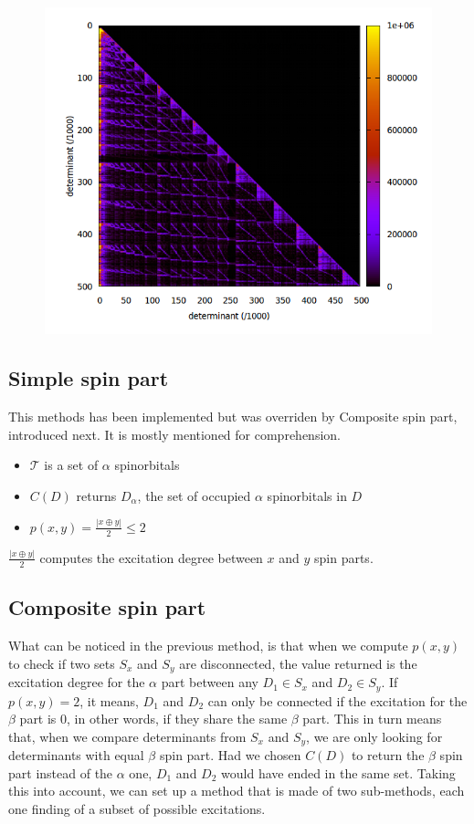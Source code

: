 \documentclass[./thesis.tex]{subfiles}
\begin{document}
\begin{figure}[H]
	\begin{center}
		\includegraphics[width=0.6\columnwidth]{figures/davidson/xor_subspace}
		\caption{{\label{fig:xor_subspace}
		}}
	\end{center}
\end{figure}


\subsection{Simple spin part}
This methods has been implemented but was overriden by Composite spin part, introduced next. It is mostly mentioned for comprehension.

\begin{itemize}
	\item
$\mathcal{T}$ is a set of $\alpha$ spinorbitals
	\item
$C(D)$ returns $D_\alpha$, the set of occupied $\alpha$ spinorbitals in $D$
	\item
$p(x, y) = \frac{|x \oplus y|}{2} \leq 2$
\end{itemize}

$\frac{|x \oplus y|}{2}$ computes the excitation degree between $x$ and $y$ spin parts. 
    

    
\subsection{Composite spin part}
What can be noticed in the previous method, is that when we compute $p(x, y)$ to check if two sets $S_x$ and $S_y$ are disconnected, the value returned is the excitation degree for the $\alpha$ part between any $D_1 \in S_x$ and $D_2 \in S_y$. If $p(x, y)=2$, it means, $D_1$ and $D_2$ can only be connected if the excitation for the $\beta$ part is 0, in other words, if they share the same $\beta$ part. This in turn means that, when we compare determinants from $S_x$ and $S_y$, we are only looking for determinants with equal $\beta$ spin part.
Had we chosen $C(D)$ to return the $\beta$ spin part instead of the $\alpha$ one, $D_1$ and $D_2$ would have ended in the same set.
Taking this into account, we can set up a method that is made of two sub-methods, each one finding of a subset of possible excitations.
\end{document}
